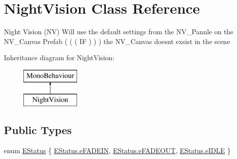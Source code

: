 \hypertarget{class_night_vision}{}\section{Night\+Vision Class Reference}
\label{class_night_vision}


Night Vision (NV) Will use the default settings from the N\+V\+\_\+\+Pannle on the N\+V\+\_\+\+Canvas Prefab ( ( ( IF ) ) ) the N\+V\+\_\+\+Canvas doesn\textquotesingle{}t exsist in the scene  


Inheritance diagram for Night\+Vision\+:\begin{figure}[H]
\begin{center}
\leavevmode
\includegraphics[height=2.000000cm]{class_night_vision}
\end{center}
\end{figure}
\subsection*{Public Types}
\begin{DoxyCompactItemize}
\item 
enum \mbox{\hyperlink{class_night_vision_a8a5978ab2bf8b47a9d498aab7a3db69b}{E\+Status}} \{ \mbox{\hyperlink{class_night_vision_a8a5978ab2bf8b47a9d498aab7a3db69ba9372966112cfdcc55c4f7832c9636060}{E\+Status.\+e\+F\+A\+D\+E\+IN}}, 
\mbox{\hyperlink{class_night_vision_a8a5978ab2bf8b47a9d498aab7a3db69ba7103e4b9687c5e110a2e22bba17935b4}{E\+Status.\+e\+F\+A\+D\+E\+O\+UT}}, 
\mbox{\hyperlink{class_night_vision_a8a5978ab2bf8b47a9d498aab7a3db69ba629f0d0f94fee574d896f31c506c18eb}{E\+Status.\+e\+I\+D\+LE}}
 \}
\end{DoxyCompactItemize}

